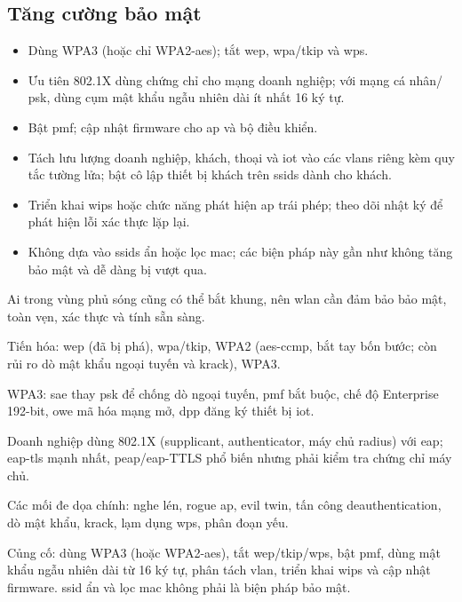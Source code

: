 \subsection{Tăng cường bảo mật}

\begin{itemize}
  \item Dùng WPA3 (hoặc chỉ WPA2-\acs{aes}); tắt \acs{wep},
    \acs{wpa}/\acs{tkip} và \acs{wps}.
  \item Ưu tiên 802.1X dùng chứng chỉ cho mạng doanh nghiệp; với mạng cá nhân/
    \acs{psk}, dùng cụm mật khẩu ngẫu nhiên dài ít nhất 16 ký tự.
  \item Bật \acs{pmf}; cập nhật firmware cho \ac{ap} và bộ điều khiển.
  \item Tách lưu lượng doanh nghiệp, khách, thoại và \ac{iot} vào các \acp{vlan}
    riêng kèm quy tắc tường lửa; bật cô lập thiết bị khách trên \acp{ssid} dành
    cho khách.
  \item Triển khai \acs{wips} hoặc chức năng phát hiện \ac{ap} trái phép; theo
    dõi nhật ký để phát hiện lỗi xác thực lặp lại.
  \item Không dựa vào \acp{ssid} ẩn hoặc lọc \acs{mac}; các biện pháp này gần
    như không tăng bảo mật và dễ dàng bị vượt qua.
\end{itemize}

\begin{tomtat}
\item Ai trong vùng phủ sóng cũng có thể bắt khung, nên \acs{wlan} cần đảm bảo bảo mật, toàn vẹn, xác thực và tính sẵn sàng.
\item Tiến hóa: \acs{wep} (đã bị phá), \acs{wpa}/\acs{tkip}, WPA2 (\acs{aes}-\acs{ccmp}, bắt tay bốn bước; còn rủi ro dò mật khẩu ngoại tuyến và \acs{krack}), WPA3.
\item WPA3: \acs{sae} thay \acs{psk} để chống dò ngoại tuyến, \acs{pmf} bắt buộc, chế độ Enterprise 192-bit, \acs{owe} mã hóa mạng mở, \acs{dpp} đăng ký thiết bị \acs{iot}.
\item Doanh nghiệp dùng 802.1X (supplicant, authenticator, máy chủ \acs{radius}) với \acs{eap}; \acs{eap}-\acs{tls} mạnh nhất, \acs{peap}/\acs{eap}-TTLS phổ biến nhưng phải kiểm tra chứng chỉ máy chủ.
\item Các mối đe dọa chính: nghe lén, rogue \acs{ap}, evil twin, tấn công deauthentication, dò mật khẩu, \acs{krack}, lạm dụng \acs{wps}, phân đoạn yếu.
\item Củng cố: dùng WPA3 (hoặc WPA2-\acs{aes}), tắt \acs{wep}/\acs{tkip}/\acs{wps}, bật \acs{pmf}, dùng mật khẩu ngẫu nhiên dài từ 16 ký tự, phân tách \acs{vlan}, triển khai \acs{wips} và cập nhật firmware. \acs{ssid} ẩn và lọc \acs{mac} không phải là biện pháp bảo mật.
\end{tomtat}
\endgroup
